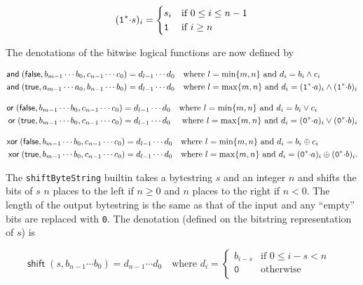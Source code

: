 $$
(\mathtt{1}^*{\cdot}s)_i =
\begin{cases}
  s_i & \text{if $0 \leq i \leq n-1$}\\
  \mathtt{1} & \text{if $i \geq n$}
\end{cases}
$$

\noindent The denotations of the bitwise logical functions are now defined by

\begin{align*}
\mathsf{and}\;(\mathsf{false}, b_{m-1} \cdots b_0, c_{n-1} \cdots c_0) &= d_{l-1} \cdots d_0 
\quad \text{where $l=\min\{m,n\}$ and $d_i = b_i \wedge c_i$}\\
\mathsf{and}\;(\mathsf{true}, a_{m-1} \cdots a_0, b_{n-1} \cdots b_0) &= d_{l-1} \cdots d_0
\quad \text{where $l=\max\{m,n\}$ and $d_i = (\mathtt{1}^*{\cdot}a)_i \wedge(\mathtt{1}^*{\cdot}b)_i$}
\end{align*}


\begin{align*}
\mathsf{or}\;(\mathsf{false}, b_{m-1} \cdots b_0, c_{n-1} \cdots c_0) &= d_{l-1} \cdots d_0
  \quad \text{where $l=\min\{m,n\}$ and $d_i = b_i \vee c_i$}\\
\mathsf{or}\;(\mathsf{true}, b_{m-1} \cdots b_0, c_{n-1} \cdots c_0) &= d_{l-1} \cdots d_0 
\quad \text{ where $l=\max\{m,n\}$ and $d_i = (\mathtt{0}^*{\cdot}a)_i \vee (\mathtt{0}^*{\cdot}b)_i$}
\end{align*}


\begin{align*}
\mathsf{xor}\;(\mathsf{false}, b_{m-1} \cdots b_0, c_{n-1} \cdots c_0) &= d_{l-1} \cdots d_0 
\quad \text{where $l=\min\{m,n\}$ and $d_i = b_i \oplus c_i$}\\
\mathsf{xor}\;(\mathsf{true}, b_{m-1} \cdots b_0, c_{n-1} \cdots c_0) &= d_{l-1} \cdots d_0 
\quad \text{where $l=\max\{m,n\}$ and $d_i = (\mathtt{0}^*{\cdot}a)_i \oplus (\mathtt{0}^*{\cdot}b)_i$.}
\end{align*}


\label{note:shift}

The \texttt{shiftByteString} builtin takes a bytestring $s$ and an integer $n$
and shifts the bits of $s$ $n$ places to the left if $n \geq 0$ and $n$ places
to the right if $n < 0$.  The length of the output bytestring is the same as
that of the input and any ``empty'' bits are replaced with \texttt{0}. The
denotation (defined on the bitstring representation of $s$) is

$$
\mathsf{shift}\;(s,b_{n-1} \cdots b_0) =
  d_{n-1} \cdots d_0 \quad \text{where }
  d_i = \begin{cases}
     b_{i-s} & \text{if $0 \leq i-s < n$ }\\
     \texttt{0} & \text{otherwise}\\
\end{cases}
$$

